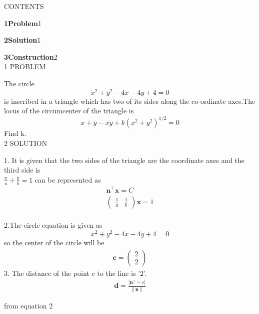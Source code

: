 \documentclass[a4paper,10pt]{report}
\newcommand{\myvec}[1]{\ensuremath{\begin{pmatrix}#1\end{pmatrix}}}
\let\vec\mathbf
\begin{document}
\begin{multicols}{2}
\centering \large\textsc{C}\footnotesize\textsc{ONTENTS}\vspace{5mm}\\
\raggedright\large\textbf{1\hspace{1cm}Problem}\hspace{5.2cm}1\vspace{5mm}\\
\raggedright\large\textbf{2\hspace{1cm}Solution}\hspace{5.25cm}1\vspace{5mm}\\
\raggedright\large\textbf{3\hspace{1cm}Construction}\hspace{4.25cm}2\vspace{5mm}\\
\centering \large\textsc{1  P}\footnotesize\textsc{ROBLEM}\vspace{5mm}\\
\raggedright\large{The circle $$ x^{2}+y^{2}-4x-4y+4=0 $$ is inscribed in a triangle which has two of its sides along the co-ordinate axes.The locus of the circumcenter of the triangle is $$ x+y-xy+k(x^{2}+y^{2})^{1/2}=0 $$ Find k.}\vspace{5mm}\\
\centering \large\textsc{2  S}\footnotesize\textsc{OLUTION}\vspace{5mm}\\
\raggedright\large{1. It is given that the two sides of the triangle are the coordinate axes and the third side is \\
${\frac{x}{a}}+{\frac{y}{b}} = 1 $ can be represented as 
\begin{align}
\vec{n}^{\top}\vec{x} = C \\
\myvec{\frac{1}{a}&\frac{1}{b}}\vec{x} = 1
\end{align} }\vspace{2mm}\\
2.The circle equation is given as $$ x^{2}+y^{2}-4x-4y+4=0$$
so the center of the circle will be 
\begin{align}
\vec{c} = \myvec{2\\2}
\end{align} 
3. The distance of the point c to the line is '2'.
\begin{align}
\vec{d} =  \frac{|\vec{n}^{\top}-c|}{\vec{\|n\|}}
\end{align}
\raggedright from equation 2
\begin{gather*}

\end{gather*}
\end{multicols}
\end{document}
